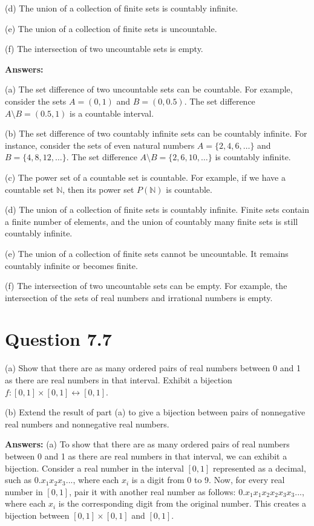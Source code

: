 \documentclass{article}
\begin{document}
(d) The union of a collection of finite sets is countably infinite.

(e) The union of a collection of finite sets is uncountable.

(f) The intersection of two uncountable sets is empty.

\textbf{Answers:}

(a) The set difference of two uncountable sets can be countable. For example, consider the sets $A = (0, 1)$ and $B = (0, 0.5)$. The set difference $A \setminus B = (0.5, 1)$ is a countable interval.

(b) The set difference of two countably infinite sets can be countably infinite. For instance, consider the sets of even natural numbers $A = \{2, 4, 6, \ldots\}$ and $B = \{4, 8, 12, \ldots\}$. The set difference $A \setminus B = \{2, 6, 10, \ldots\}$ is countably infinite.

(c) The power set of a countable set is countable. For example, if we have a countable set $\mathbb{N}$, then its power set $P(\mathbb{N})$ is countable.

(d) The union of a collection of finite sets is countably infinite. Finite sets contain a finite number of elements, and the union of countably many finite sets is still countably infinite.

(e) The union of a collection of finite sets cannot be uncountable. It remains countably infinite or becomes finite.

(f) The intersection of two uncountable sets can be empty. For example, the intersection of the sets of real numbers and irrational numbers is empty.

\section*{Question 7.7}
(a) Show that there are as many ordered pairs of real numbers between 0 and 1 as there are real numbers in that interval. Exhibit a bijection $f : [0, 1] \times [0, 1] \leftrightarrow [0, 1]$.

(b) Extend the result of part (a) to give a bijection between pairs of nonnegative real numbers and nonnegative real numbers.

\textbf{Answers:}
(a) To show that there are as many ordered pairs of real numbers between 0 and 1 as there are real numbers in that interval, we can exhibit a bijection. Consider a real number in the interval $[0, 1]$ represented as a decimal, such as $0.x_1x_2x_3...$, where each $x_i$ is a digit from 0 to 9. Now, for every real number in $[0, 1]$, pair it with another real number as follows: $0.x_1x_1x_2x_2x_3x_3...$, where each $x_i$ is the corresponding digit from the original number. This creates a bijection between $[0, 1] \times [0, 1]$ and $[0, 1]$.
\end{document}
